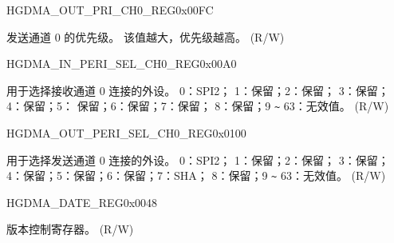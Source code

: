 \begin{register}{H}{GDMA\_OUT\_PRI\_CH0\_REG}{0x00FC}\label{regdesc:GDMAOUTPRICH0REG}
%
%
\regnewline%
\begin{regdesc}\begin{reglist}
\label{fielddesc:GDMATXPRICH0}\item [GDMA\_TX\_PRI\_CH0] 发送通道 0 的优先级。 该值越大，优先级越高。 (R/W)
\end{reglist}\end{regdesc}
\end{register}


\begin{register}{H}{GDMA\_IN\_PERI\_SEL\_CH0\_REG}{0x00A0}\label{regdesc:GDMAINPERISELCH0REG}
%
%
\regnewline%
\begin{regdesc}\begin{reglist}
\label{fielddesc:GDMAPERIINSELCH0}\item [GDMA\_PERI\_IN\_SEL\_CH0] 用于选择接收通道 0 连接的外设。 0：SPI2； 1：保留；2：保留； 3：保留；   4：保留；5： 保留；6：保留；7：保留； 8：保留；9 \verb+~+ 63：无效值。 (R/W)
\end{reglist}\end{regdesc}
\end{register}


\begin{register}{H}{GDMA\_OUT\_PERI\_SEL\_CH0\_REG}{0x0100}\label{regdesc:GDMAOUTPERISELCH0REG}
%
%
\regnewline%
\begin{regdesc}\begin{reglist}
\label{fielddesc:GDMAPERIOUTSELCH0}\item [GDMA\_PERI\_OUT\_SEL\_CH0] 用于选择发送通道 0 连接的外设。 0：SPI2； 1：保留；2：保留； 3：保留；   4：保留；5：保留；6：保留；7：SHA； 8：保留；9 \verb+~+ 63：无效值。 (R/W)
\end{reglist}\end{regdesc}
\end{register}

\begin{register}{H}{GDMA\_DATE\_REG}{0x0048}\label{regdesc:GDMADATEREG}
%
\regnewline%
\begin{regdesc}\begin{reglist}
\label{fielddesc:GDMADATE}\item [GDMA\_DATE] 版本控制寄存器。 (R/W)
\end{reglist}\end{regdesc}
\end{register}

